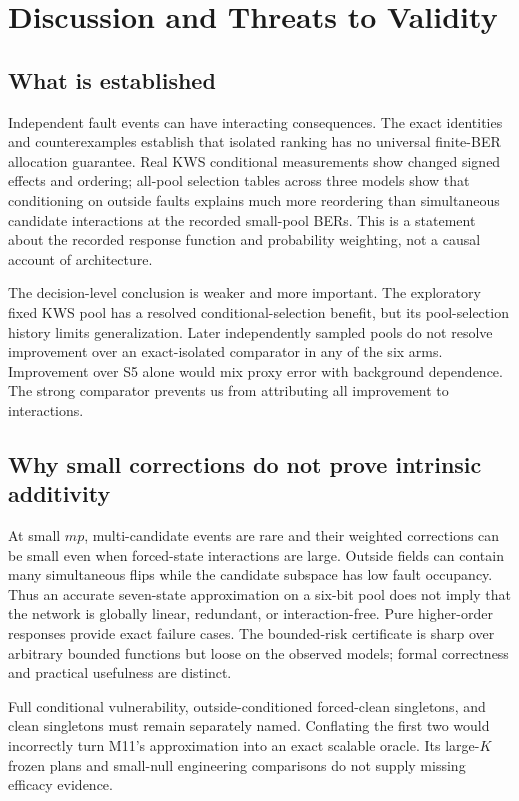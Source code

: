\section{Discussion and Threats to Validity}\label{sec:discussion}
\subsection{What is established}
Independent fault events can have interacting consequences. The exact identities and counterexamples establish that isolated ranking has no universal finite-BER allocation guarantee. Real KWS conditional measurements show changed signed effects and ordering; all-pool selection tables across three models show that conditioning on outside faults explains much more reordering than simultaneous candidate interactions at the recorded small-pool BERs. This is a statement about the recorded response function and probability weighting, not a causal account of architecture.

The decision-level conclusion is weaker and more important. The exploratory fixed KWS pool has a resolved conditional-selection benefit, but its pool-selection history limits generalization. Later independently sampled pools do not resolve improvement over an exact-isolated comparator in any of the six arms. Improvement over S5 alone would mix proxy error with background dependence. The strong comparator prevents us from attributing all improvement to interactions.

\subsection{Why small corrections do not prove intrinsic additivity}
At small $mp$, multi-candidate events are rare and their weighted corrections can be small even when forced-state interactions are large. Outside fields can contain many simultaneous flips while the candidate subspace has low fault occupancy. Thus an accurate seven-state approximation on a six-bit pool does not imply that the network is globally linear, redundant, or interaction-free. Pure higher-order responses provide exact failure cases. The bounded-risk certificate is sharp over arbitrary bounded functions but loose on the observed models; formal correctness and practical usefulness are distinct.

Full conditional vulnerability, outside-conditioned forced-clean singletons, and clean singletons must remain separately named. Conflating the first two would incorrectly turn M11's approximation into an exact scalable oracle. Its large-$K$ frozen plans and small-null engineering comparisons do not supply missing efficacy evidence.

